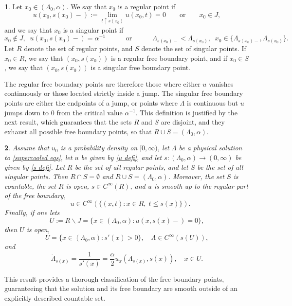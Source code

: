 \documentclass{article}
\numberwithin{equation}{section}
\numberwithin{figure}{section}
\theoremstyle{plain}
\newtheorem{thm}{\protect\theoremname}[section]
\theoremstyle{plain}
\theoremstyle{plain}
\theoremstyle{plain}
\theoremstyle{definition}
\newtheorem{defn}[thm]{\protect\definitionname}
\theoremstyle{remark}
\providecommand{\definitionname}{Definition}
\providecommand{\theoremname}{Theorem}
\begin{document}
\begin{defn} \label{def: reg sing} Let $x_0 \in (\Lambda_0,\alpha)$. We say that $x_0$ is a regular point if \begin{equation} u(x_0,s(x_0)-):=\lim_{t\uparrow s(x_0)}u(x_0,t)=0 \quad\quad  \text{or} \quad\quad  x_0\in J ,\end{equation} and we say that $x_0$ is a singular point if 
\begin{equation}x_0\notin J,\;\; u(x_0,s(x_0)-)=\alpha^{-1} \quad \quad\quad \text{or}\quad\quad \quad \Lambda_{s(x_0)-}<\Lambda_{s(x_0)}, \;\; x_0 \in \{\Lambda_{s(x_0)-},\Lambda_{s(x_0)}\}.\end{equation} Let $R$ denote the set of regular points, and $S$ denote the set of singular points. If $x_0 \in R$, we say that $(x_0,s(x_0))$ is a regular free boundary point, and if $x_0\in S$, we say that $(x_0,s(x_0))$ is a singular free boundary point.
\end{defn}
The regular free boundary points are therefore those where either $u$ vanishes continuously or those located strictly inside a jump. The singular free boundary points are either the endpoints of a jump, or points where $\Lambda$ is continuous but $u$ jumps down to $0$ from the critical value $\alpha^{-1}$. This definition is justified by the next result, which guarantees that the sets $R$ and $S$ are disjoint, and they exhaust all possible free boundary points, so that $R \cup S=(\Lambda_0,\alpha)$. 
\begin{thm}\label{thm: classification}Assume that $u_0$ is a probability density on $[0,\infty)$, let $\Lambda$ be a physical solution to \eqref{supercooled eqs}, let $u$ be given by \eqref{u defi}, and let $s:(\Lambda_0,\alpha)\to (0,\infty)$ be given by \eqref{s defi}. Let $R$ be the set of all regular points, and let $S$ be the set of all singular points. Then $R\cap S=\emptyset$ and $R\cup S=(\Lambda_0,\alpha)$. Moreover, the set $S$ is countable, the set $R$ is open, $s\in C^{\infty}(R)$, and $u$ is smooth up to the regular part of the free boundary,
\begin{equation} \label{u smooth} \quad u\in C^{\infty}(\{(x,t): x\in R,\; t\leq s(x)\}).\end{equation}  Finally, if one lets
\begin{equation}U:=R\backslash J=\{x\in (\Lambda_0,\alpha): u(x,s(x)-)=0\},    \end{equation} then $U$ is open, \[U=\{x\in(\Lambda_0,\alpha): s'(x)>0\}, \quad \Lambda\in C^{\infty}(s(U)), \] and
\begin{equation} \label{classical speed formula}
    \dot \Lambda_{s(x)}=\frac{1}{s'(x)}=\frac{\alpha}{2}u_x(\Lambda_{s(x)},s(x)),\quad x\in U.
\end{equation}
\end{thm}
This result provides a thorough classification of the free boundary points, guaranteeing that the solution and its free boundary are smooth outside of an explicitly described countable set. 
\end{document}
